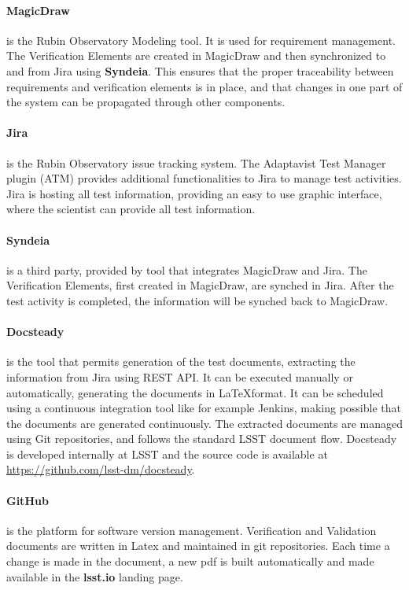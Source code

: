 \paragraph{MagicDraw}
is the Rubin Observatory Modeling tool. It is used for requirement management. The Verification Elements are created
in MagicDraw and then synchronized to and from Jira using \textbf{Syndeia}. This ensures that the proper 
traceability between requirements and verification elements is in place, and that changes in one part of the system can be propagated through other components.

\paragraph{Jira}
is the Rubin Observatory issue tracking system.
The Adaptavist Test Manager plugin (ATM) provides additional functionalities to Jira to manage test activities.
Jira is hosting all test information, providing an easy to use graphic interface, where the scientist can provide all test information.

\paragraph{Syndeia}
is a third party, provided by tool that integrates MagicDraw and Jira. The Verification Elements, first created in MagicDraw,
are synched in Jira. After the test activity is completed, the information will be synched back to MagicDraw.

\paragraph{Docsteady}
is the tool that permits generation of the test documents, extracting the information from Jira using REST API.
It can be executed manually or automatically, generating the documents in \LaTeX format.
It can be scheduled using a continuous integration tool like for example Jenkins, making possible that 
the documents are generated continuously.
The extracted documents are managed using Git repositories, and follows the  standard LSST document flow.
Docsteady is developed internally at LSST and the source code is available at \url{https://github.com/lsst-dm/docsteady}.

\paragraph{GitHub}
is the platform for software version management.
Verification and Validation documents are written in Latex and maintained in git repositories.
Each time a change is made in the document, a new pdf is built automatically and made available in the \textbf{lsst.io} landing page.

